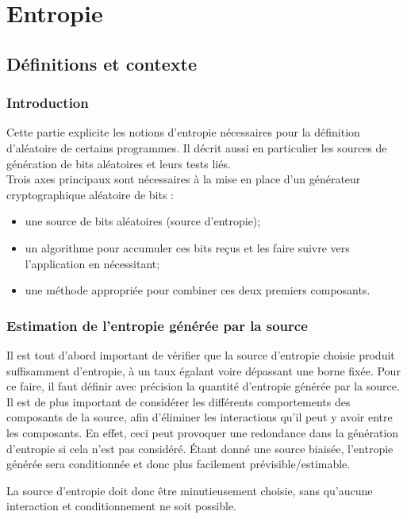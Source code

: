\chapter{Entropie}
\section{Définitions et contexte}

\subsection{Introduction}
Cette partie explicite les notions d'entropie nécessaires pour la définition d'aléatoire de certains programmes. Il décrit aussi en particulier les sources de génération de bits aléatoires et leurs tests liés. \\



Trois axes principaux sont nécessaires à la mise en place d'un générateur cryptographique aléatoire de bits : 
\begin{itemize}
\item une source de bits aléatoires (source d'entropie);
\item un algorithme pour accumuler ces bits reçus et les faire suivre vers l'application en nécessitant;
\item une méthode appropriée pour combiner ces deux premiers composants.\\
\end{itemize}


\subsection{Estimation de l'entropie générée par la source}
Il est tout d'abord important de vérifier que la source d'entropie choisie produit suffisamment d'entropie, à un taux égalant voire dépassant une borne fixée. Pour ce faire, il faut définir avec précision la quantité d'entropie générée par la source. Il est de plus important de considérer les différents comportements des composants de la source, afin d'éliminer les interactions qu'il peut y avoir entre les composants. En effet, ceci peut provoquer une redondance dans la génération d'entropie si cela n'est pas considéré. Étant donné une source biaisée, l'entropie générée sera conditionnée et donc plus facilement prévisible/estimable.

La source d'entropie doit donc être minutieusement choisie, sans qu'aucune interaction et conditionnement ne soit possible.

